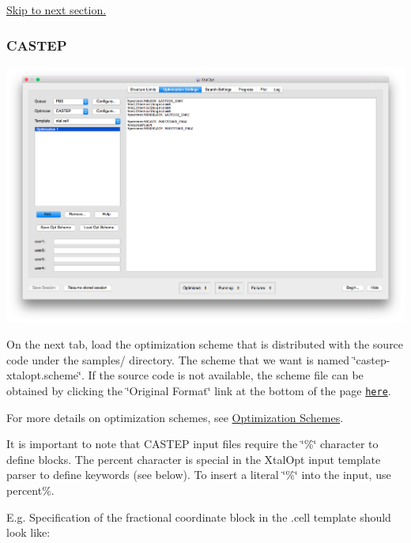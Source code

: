 \hyperlink{tut-xo_qisetup}{Skip to next section.}\hypertarget{tut-xo_castep-opt}{}\subsubsection{C\+A\+S\+T\+E\+P}\label{tut-xo_castep-opt}
 
\begin{DoxyImageNoCaption}
  \mbox{\includegraphics[width=\textwidth]{opt-set-castep.png}}
\end{DoxyImageNoCaption}


On the next tab, load the optimization scheme that is distributed with the source code under the samples/ directory. The scheme that we want is named \char`\"{}castep-\/xtalopt.\+scheme\char`\"{}. If the source code is not available, the scheme file can be obtained by clicking the \char`\"{}\+Original Format\char`\"{} link at the bottom of the page \href{http://xtalopt.github.io/samples/castep-xtalopt.scheme}{\tt here}.

For more details on optimization schemes, see \hyperlink{optschemes}{Optimization Schemes}.

It is important to note that C\+A\+S\+T\+E\+P input files require the \char`\"{}\%\char`\"{} character to define blocks. The percent character is special in the Xtal\+Opt input template parser to define keywords (see below). To insert a literal \char`\"{}\%\char`\"{} into the input, use percent\%.

E.\+g. Specification of the fractional coordinate block in the .cell template should look like\+:


\begin{DoxyCode}
\end{DoxyCode}


